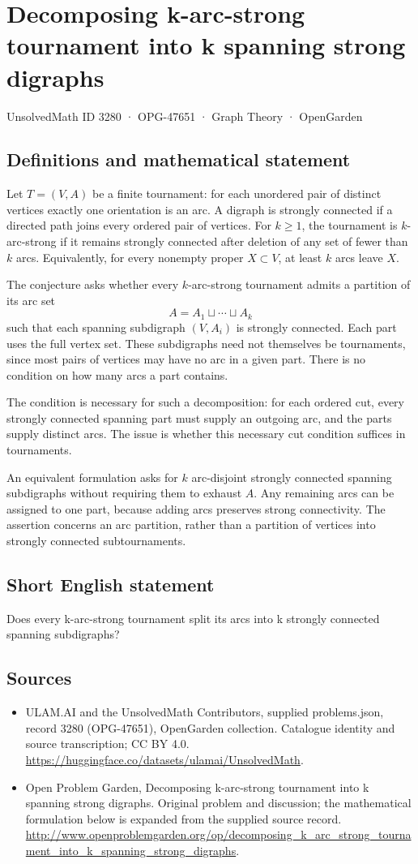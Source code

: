 \documentclass[11pt,a4paper]{article}
\begin{document}
\section*{Decomposing k-arc-strong tournament into k spanning strong digraphs}\label{3280}
{\small UnsolvedMath ID 3280 · OPG-47651 · Graph Theory · OpenGarden}
\subsection{Definitions and mathematical statement}
Let $T=(V,A)$ be a finite tournament: for each unordered pair of distinct
vertices exactly one orientation is an arc. A digraph is strongly
connected if a directed path joins every ordered pair of vertices.
For $k\ge1$, the tournament is $k$-arc-strong if it remains strongly
connected after deletion of any set of fewer than $k$ arcs. Equivalently,
for every nonempty proper $X\subset V$, at least $k$ arcs leave $X$.

The conjecture asks whether every $k$-arc-strong tournament admits a
partition of its arc set
\[
                      A=A_1\sqcup\cdots\sqcup A_k
\]
such that each spanning subdigraph $(V,A_i)$ is strongly connected.
Each part uses the full vertex set. These subdigraphs need not themselves
be tournaments, since most pairs of vertices may have no arc in a
given part. There is no condition on how many arcs a part contains.

The condition is necessary for such a decomposition: for each ordered
cut, every strongly connected spanning part must supply an outgoing
arc, and the parts supply distinct arcs. The issue is whether this
necessary cut condition suffices in tournaments.

An equivalent formulation asks for $k$ arc-disjoint strongly connected
spanning subdigraphs without requiring them to exhaust $A$. Any remaining
arcs can be assigned to one part, because adding arcs preserves strong
connectivity. The assertion concerns an arc partition, rather than a
partition of vertices into strongly connected subtournaments.
\subsection{Short English statement}
Does every k-arc-strong tournament split its arcs into k strongly connected spanning subdigraphs?
\subsection{Sources}
\begin{itemize}
\item[S1] ULAM.AI and the UnsolvedMath Contributors, supplied problems.json, record 3280 (OPG-47651), OpenGarden collection. Catalogue identity and source transcription; CC BY 4.0.
\url{https://huggingface.co/datasets/ulamai/UnsolvedMath}.
\item[S2] Open Problem Garden, Decomposing k-arc-strong tournament into k spanning strong digraphs. Original problem and discussion; the mathematical formulation below is expanded from the supplied source record.
\url{http://www.openproblemgarden.org/op/decomposing_k_arc_strong_tournament_into_k_spanning_strong_digraphs}.
\end{itemize}
\end{document}
